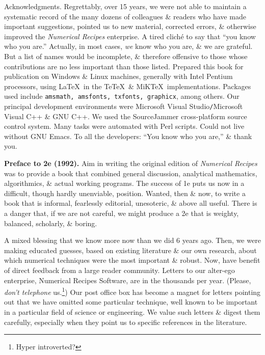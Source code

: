 \documentclass{article}
\begin{document}
\begin{enumerate}
	{\sf Acknowledgments.} Regrettably, over 15 years, we were not able to maintain a systematic record of the many dozens of colleagues \& readers who have made important suggestions, pointed us to new material, corrected errors, \& otherwise improved the {\it Numerical Recipes} enterprise. A tired clich\'e to say that ``you know who you are.'' Actually, in most cases, {\it we} know who you are, \& we are grateful. But a list of names would be incomplete, \& therefore offensive to those whose contributions are no less important than those listed. Prepared this book for publication on Windows \& Linux machines, generally with Intel Pentium processors, using \LaTeX\ in the Te\TeX\ \& MiK\TeX\ implementations. Packages used include {\tt amsmath, amsfonts, txfonts, graphicx}, among others. Our principal development environments were Microsoft Visual Studio{\tt/}Microsoft Visual C++ \& GNU C++. We used the SourceJammer cross-platform source control system. Many tasks were automated with Perl scripts. Could not live without GNU Emacs. To all the developers: ``You know who you are,'' \& thank you.
	
	{\bf Preface to 2e (1992).} Aim in writing the original edition of {\it Numerical Recipes} was to provide a book that combined general discussion, analytical mathematics, algorithmics, \& actual working programs. The success of 1e puts us now in a difficult, though hardly unenviable, position. Wanted, then \& now, to write a book that is informal, fearlessly editorial, unesoteric, \& above all useful. There is a danger that, if we are not careful, we might produce a 2e that is weighty, balanced, scholarly, \& boring.
	
	A mixed blessing that we know more now than we did 6 years ago. Then, we were making educated guesses, based on existing literature \& our own research, about which numerical techniques were the most important \& robust. Now, have benefit of direct feedback from a large reader community. Letters to our alter-ego enterprise, Numerical Recipes Software, are in the thousands per year. (Please, {\it don't telephone} us.\footnote{Hyper introverted?}) Our post office box has become a magnet for letters pointing out that we have omitted some particular technique, well known to be important in a particular field of science or engineering. We value such letters \& digest them carefully, especially when they point us to specific references in the literature.
	

\end{enumerate}
\end{document}
